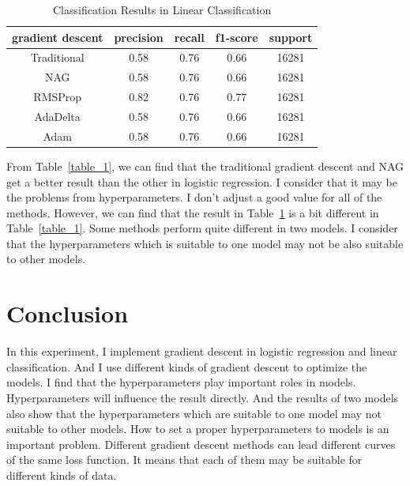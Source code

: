 \documentclass[journal, a4paper]{IEEEtran}
\begin{document}
    \begin{table}[!hbt]
		\begin{center}
		\caption{Classification Results in Linear Classification}
		\label{table_2}
		\begin{tabular}{|c|c|c|c|c|}
			\hline
			gradient descent  & precision & recall & f1-score & support \\
			\hline
			Traditional & 0.58 & 0.76 & 0.66 & 16281 \\
			\hline
			NAG & 0.58 & 0.76 & 0.66  & 16281 \\
			\hline
			RMSProp & 0.82 & 0.76 & 0.77 & 16281 \\
			\hline
            AdaDelta & 0.58 & 0.76 & 0.66 & 16281 \\
			\hline
            Adam & 0.58 & 0.76 & 0.66 & 16281 \\
			\hline
		\end{tabular}
		\end{center}
	\end{table}

From Table~\ref{table_1}, we can find that the traditional gradient descent and NAG get a better result than the other in logistic regression. I consider that it may be the problems from hyperparameters. I don't adjust a good value for all of the methods. However, we can find that the result in Table~\ref{table_2} is a bit different in Table~\ref{table_1}. Some methods perform quite different in two models. I consider that the hyperparameters which is suitable to one model may not be also suitable to other models.

\section{Conclusion}
In this experiment, I implement gradient descent in logistic regression and linear classification. And I use different kinds of gradient descent to optimize the models. I find that the hyperparameters play important roles in models. Hyperparameters will influence the result directly. And the results of two models also show that the hyperparameters which are suitable to one model may not suitable to other models. How to set a proper hyperparameters to models is an important problem. Different gradient descent methods can lead different curves of the same loss function. It means that each of them may be suitable for different kinds of data. 

\end{document}
